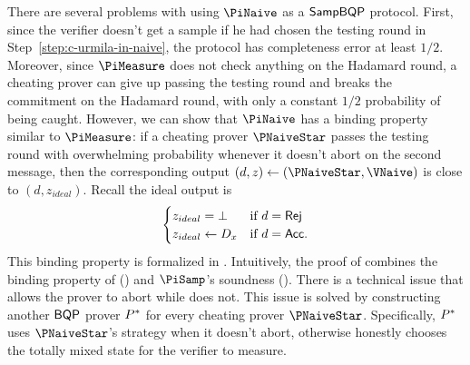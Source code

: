 There are several problems with using $\PiNaive$ as a $\operatorname{\mathsf{SampBQP}}$ protocol. First, since the verifier doesn't get a sample if he had chosen the testing round in Step~\ref{step:c-urmila-in-naive}, the protocol has completeness error at least $1/2$. Moreover, since $\PiMeasure$ does not check anything on the Hadamard round, a cheating prover can give up passing the testing round and breaks the commitment on the Hadamard round, with only a constant $1/2$ probability of being caught.
However, we can show that $\PiNaive$ has a binding property similar to $\PiMeasure$:
if a cheating prover $\PNaiveStar$ passes the testing round with overwhelming probability whenever it doesn't abort on the second message,
then the corresponding output $(d, z)\leftarrow(\PNaiveStar, \VNaive)$ is close to $(d, z_{ideal})$.
Recall the ideal output is
$$\begin{cases}
	z_{ideal}=\bot & \text{if } d=\mathsf{Rej}\\
	z_{ideal}\leftarrow D_x & \text{if } d=\mathsf{Acc}.
\end{cases}$$
This binding property is formalized in .
Intuitively,  the proof of   combines the binding property of  () and $\PiSamp$'s soundness (). There is a technical issue that  allows the prover to abort while  does not. This issue is solved by constructing another $\operatorname{\mathsf{BQP}}$ prover $P^*$ for every cheating prover $\PNaiveStar$. 
Specifically, $P^*$ uses $\PNaiveStar$'s strategy when it doesn't abort, otherwise honestly chooses the totally mixed state for the verifier to measure.

